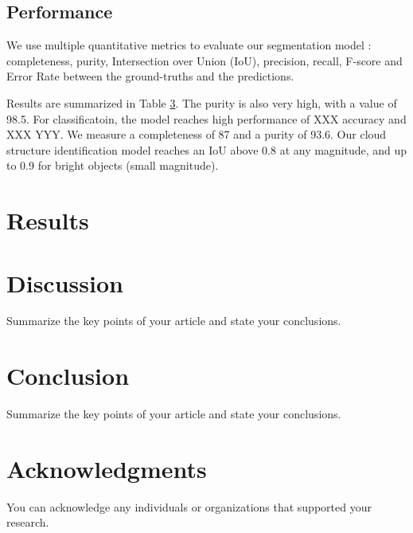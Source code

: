 \documentclass{article}
\begin{document}
\subsection{Performance}

We use multiple quantitative metrics to evaluate our segmentation model : completeness, purity, Intersection over Union (IoU), precision, recall, F-score and Error Rate between the ground-truths and the predictions.

Results are summarized in Table \ref{}. The purity is also
very high, with a value of 98.5. For classificatoin, the model reaches high performance of XXX accuracy and XXX YYY. We measure a completeness of 87 and a purity of 93.6. Our cloud structure identification model reaches an IoU above 0.8 at any magnitude, and up to 0.9 for bright objects (small magnitude).

\section{Results}


\section{Discussion}
Summarize the key points of your article and state your conclusions.


\section{Conclusion}
Summarize the key points of your article and state your conclusions.

\section*{Acknowledgments}
You can acknowledge any individuals or organizations that supported your research.



\end{document}
